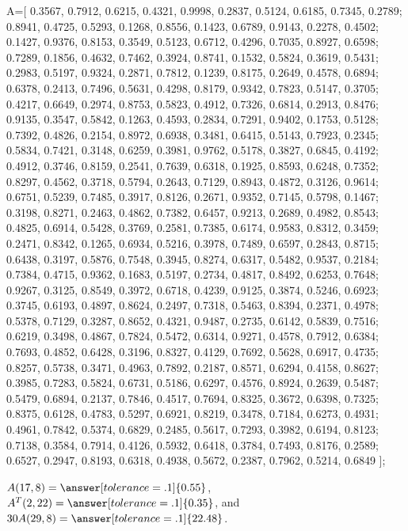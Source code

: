\documentclass{ximera}
\begin{document}
\begin{exercise}
\begin{enumerate}
\begin{hint}
    A=[
  0.3567, 0.7912, 0.6215, 0.4321, 0.9998, 0.2837, 0.5124, 0.6185, 0.7345, 0.2789;
  0.8941, 0.4725, 0.5293, 0.1268, 0.8556, 0.1423, 0.6789, 0.9143, 0.2278, 0.4502;
  0.1427, 0.9376, 0.8153, 0.3549, 0.5123, 0.6712, 0.4296, 0.7035, 0.8927, 0.6598;
  0.7289, 0.1856, 0.4632, 0.7462, 0.3924, 0.8741, 0.1532, 0.5824, 0.3619, 0.5431;
  0.2983, 0.5197, 0.9324, 0.2871, 0.7812, 0.1239, 0.8175, 0.2649, 0.4578, 0.6894;
  0.6378, 0.2413, 0.7496, 0.5631, 0.4298, 0.8179, 0.9342, 0.7823, 0.5147, 0.3705;
  0.4217, 0.6649, 0.2974, 0.8753, 0.5823, 0.4912, 0.7326, 0.6814, 0.2913, 0.8476;
  0.9135, 0.3547, 0.5842, 0.1263, 0.4593, 0.2834, 0.7291, 0.9402, 0.1753, 0.5128;
  0.7392, 0.4826, 0.2154, 0.8972, 0.6938, 0.3481, 0.6415, 0.5143, 0.7923, 0.2345;
  0.5834, 0.7421, 0.3148, 0.6259, 0.3981, 0.9762, 0.5178, 0.3827, 0.6845, 0.4192;
  0.4912, 0.3746, 0.8159, 0.2541, 0.7639, 0.6318, 0.1925, 0.8593, 0.6248, 0.7352;
  0.8297, 0.4562, 0.3718, 0.5794, 0.2643, 0.7129, 0.8943, 0.4872, 0.3126, 0.9614;
  0.6751, 0.5239, 0.7485, 0.3917, 0.8126, 0.2671, 0.9352, 0.7145, 0.5798, 0.1467;
  0.3198, 0.8271, 0.2463, 0.4862, 0.7382, 0.6457, 0.9213, 0.2689, 0.4982, 0.8543;
  0.4825, 0.6914, 0.5428, 0.3769, 0.2581, 0.7385, 0.6174, 0.9583, 0.8312, 0.3459;
  0.2471, 0.8342, 0.1265, 0.6934, 0.5216, 0.3978, 0.7489, 0.6597, 0.2843, 0.8715;
  0.6438, 0.3197, 0.5876, 0.7548, 0.3945, 0.8274, 0.6317, 0.5482, 0.9537, 0.2184;
  0.7384, 0.4715, 0.9362, 0.1683, 0.5197, 0.2734, 0.4817, 0.8492, 0.6253, 0.7648;
  0.9267, 0.3125, 0.8549, 0.3972, 0.6718, 0.4239, 0.9125, 0.3874, 0.5246, 0.6923;
  0.3745, 0.6193, 0.4897, 0.8624, 0.2497, 0.7318, 0.5463, 0.8394, 0.2371, 0.4978;
  0.5378, 0.7129, 0.3287, 0.8652, 0.4321, 0.9487, 0.2735, 0.6142, 0.5839, 0.7516;
    0.6219, 0.3498, 0.4867, 0.7824, 0.5472, 0.6314, 0.9271, 0.4578, 0.7912, 0.6384;
    0.7693, 0.4852, 0.6428, 0.3196, 0.8327, 0.4129, 0.7692, 0.5628, 0.6917, 0.4735;
    0.8257, 0.5738, 0.3471, 0.4963, 0.7892, 0.2187, 0.8571, 0.6294, 0.4158, 0.8627;
    0.3985, 0.7283, 0.5824, 0.6731, 0.5186, 0.6297, 0.4576, 0.8924, 0.2639, 0.5487;
    0.5479, 0.6894, 0.2137, 0.7846, 0.4517, 0.7694, 0.8325, 0.3672, 0.6398, 0.7325;
    0.8375, 0.6128, 0.4783, 0.5297, 0.6921, 0.8219, 0.3478, 0.7184, 0.6273, 0.4931;
    0.4961, 0.7842, 0.5374, 0.6829, 0.2485, 0.5617, 0.7293, 0.3982, 0.6194, 0.8123;
    0.7138, 0.3584, 0.7914, 0.4126, 0.5932, 0.6418, 0.3784, 0.7493, 0.8176, 0.2589;
    0.6527, 0.2947, 0.8193, 0.6318, 0.4938, 0.5672, 0.2387, 0.7962, 0.5214, 0.6849
];

  \end{hint}

$A(17,8)=\answer[tolerance=.1]{0.55}$, $A^T(2,22)=\answer[tolerance=.1]{0.35}$, and $30A(29,8)=\answer[tolerance=.1]{22.48}$.

\end{enumerate}

\end{exercise}
\end{document}

